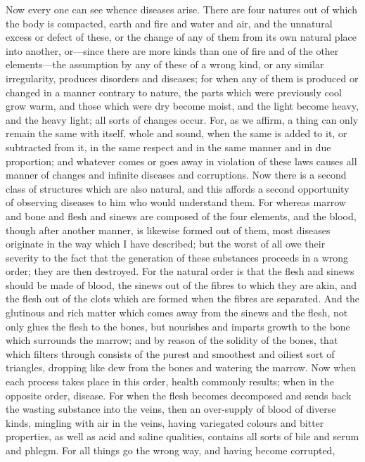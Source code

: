 Now every one can see whence diseases arise. There are four natures out of
which the body is compacted, earth and fire and water and air, and the
unnatural excess or defect of these, or the change of any of them from its
own natural place into another, or—since there are more kinds than
one of fire and of the other elements—the assumption by any of these
of a wrong kind, or any similar irregularity, produces disorders and
diseases; for when any of them is produced or changed in a manner contrary
to nature, the parts which were previously cool grow warm, and those which
were dry become moist, and the light become heavy, and the heavy light;
all sorts of changes occur. For, as we affirm, a thing can only remain the
same with itself, whole and sound, when the same is added to it, or
subtracted from it, in the same respect and in the same manner and in due
proportion; and whatever comes or goes away in violation of these laws
causes all manner of changes and infinite diseases and corruptions. Now
there is a second class of structures which are also natural, and this
affords a second opportunity of observing diseases to him who would
understand them. For whereas marrow and bone and flesh and sinews are
composed of the four elements, and the blood, though after another manner,
is likewise formed out of them, most diseases originate in the way which I
have described; but the worst of all owe their severity to the fact that
the generation of these substances proceeds in a wrong order; they are
then destroyed. For the natural order is that the flesh and sinews should
be made of blood, the sinews out of the fibres to which they are akin, and
the flesh out of the clots which are formed when the fibres are separated.
And the glutinous and rich matter which comes away from the sinews and the
flesh, not only glues the flesh to the bones, but nourishes and imparts
growth to the bone which surrounds the marrow; and by reason of the
solidity of the bones, that which filters through consists of the purest
and smoothest and oiliest sort of triangles, dropping like dew from the
bones and watering the marrow. Now when each process takes place in this
order, health commonly results; when in the opposite order, disease. For
when the flesh becomes decomposed and sends back the wasting substance
into the veins, then an over-supply of blood of diverse kinds, mingling
with air in the veins, having variegated colours and bitter properties, as
well as acid and saline qualities, contains all sorts of bile and serum
and phlegm. For all things go the wrong way, and having become corrupted,
